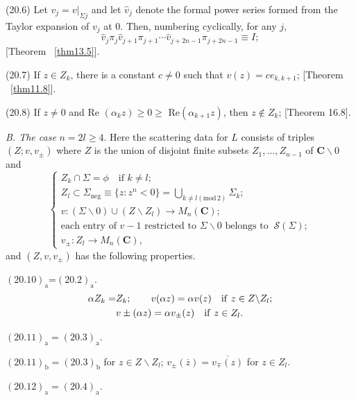 \documentclass{surv-l}
\theoremstyle{plain}
\theoremstyle{definition}
\numberwithin{equation}{chapter}
\begin{document}
(20.6) Let $v_{j}=v|_{\Sigma j}$ and let $\hat{v}_{j}$ denote the formal power series formed from the Taylor expansion of $v_{j}$ at 0. Then, numbering cyclically, for any $j$,
\begin{equation*}
\hat{v}_{j}\pi_{j}\hat{v}_{j+1}\pi_{j+1}\cdots\hat{v}_{j+2n-1} \pi_{j+2n-1}\equiv I;
\end{equation*}
[Theorem ~\ref{thm13.5}].

(20.7) If $z \in Z_{k}$, there is a constant $c\neq 0$ such that $v(z)=ce_{k,k+1}$; [Theorem ~\ref{thm11.8}].

(20.8) If $z\neq 0$ and  Re $(\alpha_{k}z)\geq 0\geq$ Re$(\alpha_{k+1}z)$, then $z\not\in Z_{k}$; [Theorem 16.8].

\emph{B. The case} $n=2l\geq 4$. Here the scattering data for $L$ consists of triples $(Z;v, v_{\pm})$ where $Z$ is the union of disjoint finite subsets $Z_{1},\ldots, Z_{n-1}$ of $\mathbf{C}\backslash 0$ and
\setcounter{equation}{8}
\begin{equation}\label{eq20.9}
\left\{\begin{array}{l}
Z_{k}\cap\Sigma=\phi \quad \text{if } k\neq l;\\
Z_{l}\subset\Sigma_{\mathrm{neg}}\equiv\{z:z^{n}<0\}=\bigcup_{k\neq l(\mathrm{mod}\, 2)}\Sigma_{k};\\
v : (\Sigma\backslash 0)\cup(Z\backslash Z_{l})\rightarrow M_{n}(\mathbf{C});\\
\text{each entry of }v-1\text{ restricted to } \Sigma\backslash 0\text{ belongs to }\ \mathscr{S}(\Sigma);\\
v_{\pm}:Z_{l}\rightarrow M_{n}(\mathbf{C}),
\end{array}\right.
\end{equation}
and $(Z, v, v_{\pm})$ has the following properties.


$\mathrm{(20.10)_{\mathrm{a}}}$=$\mathrm{(20.2)_{\mathrm{a}}}$.
\renewcommand\theequation{20.10$_{\mathrm{b}}$}
\begin{align}\label{eq20.10}
\alpha Z_{k}=&Z_{k}; \qquad v(\alpha z)=\alpha v(z) \quad \mathrm{if}\ z\in Z \backslash Z_{l};\\
&v\pm(\alpha z)=\alpha v_{\pm}(z)\quad \mathrm{if}\ z\in Z_{l}. \notag
\end{align}

$\mathrm{(20.11)_{a}=(20.3)_{a}}$.

$\mathrm{(20.11)_{b}=(20.3)_{b}}$ for $z\in Z\backslash Z_{l}$; $v_{\pm}(\overline{z})=\overline{v_{\mp}(z)}$ for $z\in Z_{l}$.

$\mathrm{(20.12)_{a}=(20.4)_{a}}$.
\end{document}
